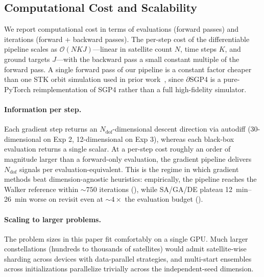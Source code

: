 \subsection{Computational Cost and Scalability}
\label{sec:cost}

We report computational cost in terms of evaluations (forward passes) and iterations (forward + backward passes). The per-step cost of the differentiable pipeline scales as $\mathcal{O}(NKJ)$---linear in satellite count $N$, time steps $K$, and ground targets $J$---with the backward pass a small constant multiple of the forward pass.
A single forward pass of our pipeline is a constant factor cheaper than one STK orbit simulation used in prior work~\citep{paek_optimization_2019}, since $\partial$SGP4 is a pure-PyTorch reimplementation of SGP4 rather than a full high-fidelity simulator.

\paragraph{Information per step.}
Each gradient step returns an $N_{\text{dof}}$-dimensional descent direction via autodiff (30-dimensional on Exp 2, 12-dimensional on Exp 3), whereas each black-box evaluation returns a single scalar.
At a per-step cost roughly an order of magnitude larger than a forward-only evaluation, the gradient pipeline delivers $N_{\text{dof}}$ signals per evaluation-equivalent. This is the regime in which gradient methods beat dimension-agnostic heuristics: empirically, the pipeline reaches the Walker reference within ${\sim}750$ iterations (), while SA/GA/DE plateau \SI{12}{\minute}--\SI{26}{\minute} worse on revisit even at ${\sim}4\times$ the evaluation budget ().

\paragraph{Scaling to larger problems.}
The problem sizes in this paper fit comfortably on a single GPU. Much larger constellations (hundreds to thousands of satellites) would admit satellite-wise sharding across devices with data-parallel strategies, and multi-start ensembles across initializations parallelize trivially across the independent-seed dimension.
